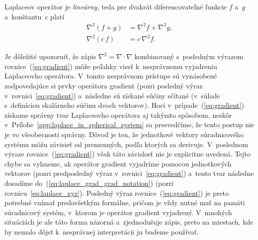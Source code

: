 \documentclass[a4paper, 12pt]{book}
\begin{document}
Laplaceov operátor je \emph{lineárny}, teda pre dvakrát diferencovateľné 
funkcie $f$ a~$g$ a~konštantu~$c$ platí
%
\begin{align}
\label{eq:laplace_additivity}
\nabla^2 \left(f + g \right) &= \nabla^2 f + \nabla^2 g{,}\\
%
\label{eq:laplace_homogenity}
\nabla^2 (c \, f) &= c \, \nabla^2 f{.}
\end{align}

Je dôležité upozorniť, že zápis $\nabla^2 = \nabla \cdot \nabla$ kombinovaný 
s~posledným výrazom rovnice~(\ref{eq:gradient}) môže poľahky viesť 
k~nesprávnemu vyjadreniu Laplaceovho operátora.  V~tomto nesprávnom prístupe sú 
vynásobené zodpovedajúce si prvky operátora gradient (pozri posledný výraz 
v~rovnici~\ref{eq:gradient}) a~následne sú získané súčiny sčítané (v~súlade 
s~definíciou skalárneho súčinu dvoch vektorov).  Hoci 
v~prípade~(\ref{eq:gradient}) získame správny tvar Laplaceovho operátora aj 
takýmto spôsobom, neskôr v~Prílohe~\ref{app:laplace_in_spherical_system} sa 
presvedčíme, že tento postup nie je vo všeobecnosti správny.  Dôvod je ten, že 
jednotkové vektory súradnicového systému môžu závisieť od premenných, podľa 
ktorých sa derivuje.  V~poslednom výraze rovnice~(\ref{eq:gradient}) však táto 
závislosť nie je explicitne uvedená.  Tejto chybe sa vyhneme, ak operátor 
gradient vyjadríme pomocou jednotkových vektorov (pozri predposledný výraz 
v~rovnici~\ref{eq:gradient}) a~tento tvar následne dosadíme 
do~(\ref{eq:laplace_grad_grad_notation}) (pozri rovnicu~\ref{eq:laplace_xyz}).  
Posledný výraz rovnice~(\ref{eq:gradient}) je preto potrebné vnímať 
predovšetkým formálne, pričom je vždy nutné mať na pamäti súradnicový systém, 
v~ktorom je operátor gradient vyjadrený.  V~mnohých situáciách je ale táto 
forma názorná a~zjednodušuje zápis, preto na miestach, kde by nemalo dôjsť 
k~nesprávnej interpretácii ju budeme používať.
\end{document}
